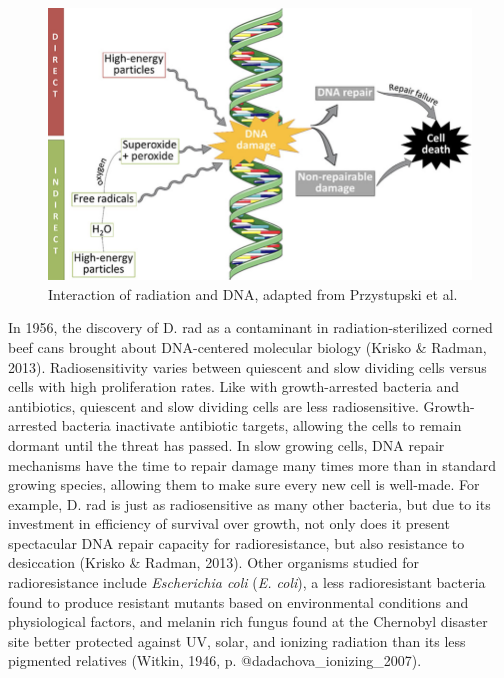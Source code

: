 \documentclass[12pt,twoside]{reedthesis}
\begin{document}
\begin{figure}

{\centering \includegraphics[width=1\linewidth]{figure/radiation_DNA} 

}

\caption{Interaction of radiation and DNA, adapted from Przystupski et al.}\label{fig:radiationDNA}
\end{figure}
In 1956, the discovery of D. rad as a contaminant in radiation-sterilized corned beef cans brought about DNA-centered molecular biology (Krisko \& Radman, 2013). Radiosensitivity varies between quiescent and slow dividing cells versus cells with high proliferation rates. Like with growth-arrested bacteria and antibiotics, quiescent and slow dividing cells are less radiosensitive. Growth-arrested bacteria inactivate antibiotic targets, allowing the cells to remain dormant until the threat has passed. In slow growing cells, DNA repair mechanisms have the time to repair damage many times more than in standard growing species, allowing them to make sure every new cell is well-made. For example, D. rad is just as radiosensitive as many other bacteria, but due to its investment in efficiency of survival over growth, not only does it present spectacular DNA repair capacity for radioresistance, but also resistance to desiccation (Krisko \& Radman, 2013). Other organisms studied for radioresistance include \emph{Escherichia coli} (\emph{E. coli}), a less radioresistant bacteria found to produce resistant mutants based on environmental conditions and physiological factors, and melanin rich fungus found at the Chernobyl disaster site better protected against UV, solar, and ionizing radiation than its less pigmented relatives (Witkin, 1946, p. @dadachova\_ionizing\_2007).
\end{document}
